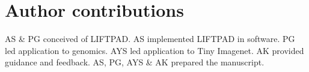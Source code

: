 \documentclass{article}
\begin{document}
\section{Author contributions}

AS \& PG conceived of LIFTPAD. AS implemented LIFTPAD in software. PG led application to genomics. AYS led application to Tiny Imagenet. AK provided guidance and feedback. AS, PG, AYS \& AK prepared the manuscript.

\nocite{*}


\end{document}
